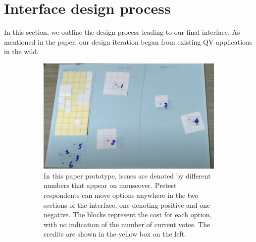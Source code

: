 \section{Interface design process}\label{apdx:design}
In this section, we outline the design process leading to our final interface. As mentioned in the paper, our design iteration began from existing QV applications in the wild.

\begin{figure}[ht]
    \centering
    \begin{subfigure}[b]{0.54\textwidth}
        \centering
        \includegraphics[width=\textwidth]{content/image/prototypes/1.2_paper_qv_single.png}
        \caption{In this paper prototype, issues are denoted by different numbers that appear on mouseover. Pretest respondents can move options anywhere in the two sections of the interface, one denoting positive and one negative. The blocks represent the cost for each option, with no indication of the number of current votes. The credits are shown in the yellow box on the left.}
        \label{fig:horizontal_paper}
    \end{subfigure}
    \hfill
    \begin{subfigure}[b]{0.42\textwidth}

\end{subfigure}
\end{figure}
